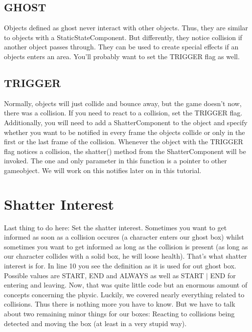 \documentclass{article}
\begin{document}
\subsection{GHOST}

Objects defined as ghost never interact with other objects. Thus, they are similar to objects with a StaticStateComponent. But differently, they notice collision if another object passes through. They can be used to create special effects if an objects enters an area. You'll probably want to set the TRIGGER flag as well.

\subsection{TRIGGER}

Normally, objects will just collide and bounce away, but the game doesn't now, there was a collision. If you need to react to a collision, set the TRIGGER flag. Additionally, you will need to add a ShatterComponent to the object and specify whether you want to be notified in every frame the objects collide or only in the first or the last frame of the collision. Whenever the object with the TRIGGER flag notices a collision, the shatter() method from the ShatterComponent will be invoked. The one and only parameter in this function is a pointer to other gameobject. We will work on this notifies later on in this tutorial.

\section{Shatter Interest}

Last thing to do here: Set the shatter interest. Sometimes you want to get informed as soon as a collision occures (a character enters our ghost box) whilst sometimes you want to get informed as long as the collision is present (as long as our character collides with a solid box, he will loose health). That's what shatter interest is for. In line 10 you see the definition as it is used for out ghost box. Possible values are START, END and ALWAYS as well as START $|$ END for entering and leaving.\newline
Now, that was quite little code but an enormous amount of concepts concerning the physic. Luckily, we covered nearly everything related to collisions. Thus there is nothing more you have to know. But we have to talk about two remaining minor things for our boxes: Reacting to collisions being detected and moving the box (at least in a very stupid way).
\end{document}
